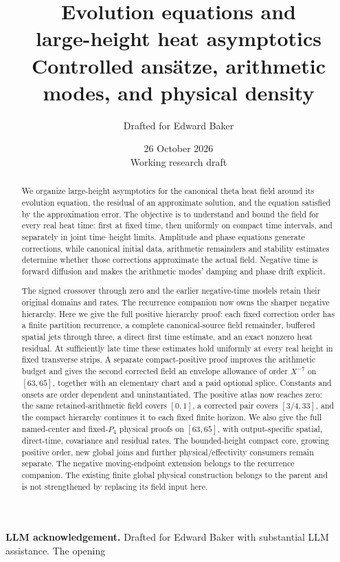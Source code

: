 \documentclass[11pt]{article}
\title{Evolution equations and\\large-height heat asymptotics\\
\large Controlled ans\"atze, arithmetic modes, and physical density}
\author{Drafted for Edward Baker}
\date{26 October 2026\\[.3em]\small Working research draft}
\numberwithin{equation}{section}
\begin{document}
\maketitle
\begin{abstract}
We organize large-height asymptotics for the canonical theta heat field
around its evolution equation, the residual of an approximate solution,
and the equation satisfied by the approximation error. The objective is
to understand and bound the field for every real heat time: first at
fixed time, then uniformly on compact time intervals, and separately in
joint time--height limits. Amplitude and phase equations generate
corrections, while canonical initial data, arithmetic remainders and
stability estimates determine whether those corrections approximate
the actual field. Negative time is forward diffusion and makes the
arithmetic modes' damping and phase drift explicit.

The signed crossover through zero and the earlier negative-time models
retain their original domains and rates. The recurrence companion now
owns the sharper negative hierarchy. Here we give the full positive
hierarchy proof: each fixed correction order has a finite partition
recurrence, a complete canonical-source field remainder, buffered
spatial jets through three, a direct first time estimate, and an exact
nonzero heat residual. At sufficiently late time these estimates hold
uniformly at every real height in fixed transverse strips. A separate
compact-positive proof improves the arithmetic budget and gives the
second corrected field an envelope allowance of order $X^{-7}$ on
$[63,65]$, together with an elementary chart and a paid optional splice.
Constants and onsets are order dependent and uninstantiated. The positive atlas now reaches zero: the same retained-arithmetic field
covers $[0,1]$, a corrected pair covers $[3/4,33]$, and the compact
hierarchy continues it to each fixed finite horizon. We also give the
full named-center and fixed-$P_4$ physical proofs on $[63,65]$, with
output-specific spatial, direct-time, covariance and residual rates.
The bounded-height compact core, growing positive order, new global
joins and further physical/effectivity consumers remain separate.
The negative moving-endpoint extension belongs to the recurrence companion. The existing finite global physical construction belongs to the
parent and is not strengthened by replacing its field input here.
\end{abstract}
\begingroup\footnotesize
\noindent\textbf{LLM acknowledgement.}
Drafted for Edward Baker with substantial LLM assistance. The opening
\end{document}
